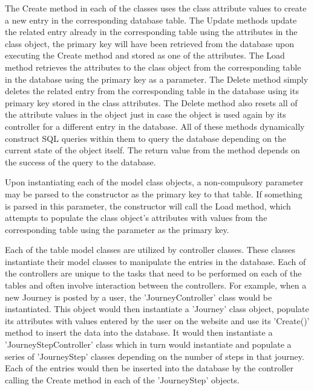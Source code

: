 The Create method in each of the classes uses the class attribute values to create a new entry in the corresponding database table. The Update methods update the related entry already in the corresponding table using the attributes in the class object, the primary key will have been retrieved from the database upon executing the Create method and stored as one of the attributes. The Load method retrieves the attributes to the class object from the corresponding table in the database using the primary key as a parameter. The Delete method simply deletes the related entry from the corresponding table in the database using its primary key stored in the class attributes. The Delete method also resets all of the attribute values in the object just in case the object is used again by its controller for a different entry in the database. All of these methods dynamically construct SQL queries within them to query the database depending on the current state of the object itself. The return value from the method depends on the success of the query to the database.
		
		Upon instantiating each of the model class objects, a non-compulsory parameter may be parsed to the constructor as the primary key to that table. If something is parsed in this parameter, the constructor will call the Load method, which attempts to populate the class object's attributes with values from the corresponding table using the parameter as the primary key.
		
		Each of the table model classes are utilized by controller classes. These classes instantiate their model classes to manipulate the entries in the database. Each of the controllers are unique to the tasks that need to be performed on each of the tables and often involve interaction between the controllers. For example, when a new Journey is posted by a user, the 'Journey\textunderscore Controller' class would be instantiated. This object would then instantiate a 'Journey' class object, populate its attributes with values entered by the user on the website and use its 'Create()' method to insert the data into the database. It would then instantiate a 'Journey\textunderscore Step\textunderscore Controller' class which in turn would instantiate and populate a series of 'Journey\textunderscore Step' classes depending on the number of steps in that journey. Each of the entries would then be inserted into the database by the controller calling the Create method in each of the 'Journey\textunderscore Step' objects. 	
				
